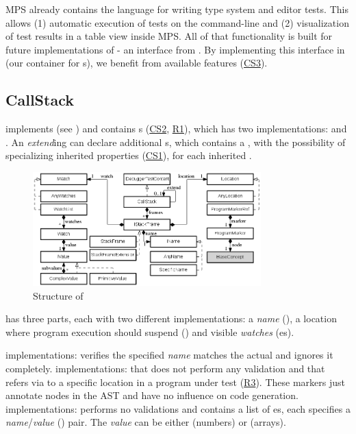 \ac{MPS} already contains the language  for writing type
system and editor tests. This allows (1) automatic execution
of tests on the command-line and 
(2) visualization of test results in a table view inside \ac{MPS}.
All of that functionality is built for future implementations of 
- an interface from . By implementing this interface in
 (our container for s), we benefit from
available features (\hyperref[CS3]{CS3}).

\subsection{CallStack}

 implements  
(see ) and contains
s (\hyperref[CS2]{CS2}, \hyperref[R1]{R1}),
which has two implementations:
 and .
An \emph{extend}ing  can declare additional
s, which contains a , with the
possibility of specializing inherited properties (\hyperref[CS1]{CS1}), for
each inherited .
\vspace{1mm}

\begin{figure}[h]
  \vspace{-3mm}
  \centering
    \includegraphics[width=8.8cm]{./figures/graph3-2.png} 
    \vspace{-2mm}
    \caption{Structure of }
  \label{fig:CallStackStructure}
\end{figure}

 has three parts, each with two different implementations: a
\emph{name} (), a location where program execution
should suspend () and visible \emph{watches}
(es). 


 implementations:  verifies
the specified \emph{name} matches the actual and  ignores it
completely.  implementations:
 that does not perform any validation and 
 that refers via  to a specific
location in a program under test (\hyperref[R3]{R3}). These markers just
annotate nodes in the \ac{AST} and have no influence on code generation.
 implementations:  performs no validations and
 contains a list of es,
each specifies a \emph{name}/\emph{value} () pair. The \emph{value}
can be either  (\eg numbers) or  (\eg arrays).

